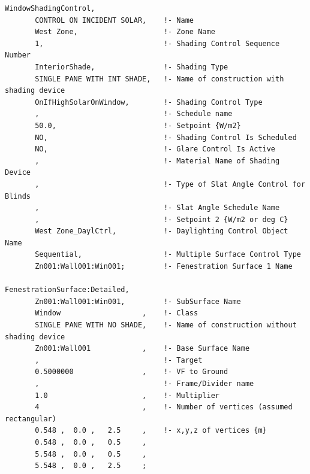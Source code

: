 \begin{lstlisting}
WindowShadingControl,
       CONTROL ON INCIDENT SOLAR,    !- Name
       West Zone,                    !- Zone Name
       1,                            !- Shading Control Sequence Number
       InteriorShade,                !- Shading Type
       SINGLE PANE WITH INT SHADE,   !- Name of construction with shading device
       OnIfHighSolarOnWindow,        !- Shading Control Type
       ,                             !- Schedule name
       50.0,                         !- Setpoint {W/m2}
       NO,                           !- Shading Control Is Scheduled
       NO,                           !- Glare Control Is Active
       ,                             !- Material Name of Shading Device
       ,                             !- Type of Slat Angle Control for Blinds
       ,                             !- Slat Angle Schedule Name
       ,                             !- Setpoint 2 {W/m2 or deg C}
       West Zone_DaylCtrl,           !- Daylighting Control Object Name
       Sequential,                   !- Multiple Surface Control Type
       Zn001:Wall001:Win001;         !- Fenestration Surface 1 Name

FenestrationSurface:Detailed,
       Zn001:Wall001:Win001,         !- SubSurface Name
       Window                   ,    !- Class
       SINGLE PANE WITH NO SHADE,    !- Name of construction without shading device
       Zn001:Wall001            ,    !- Base Surface Name
       ,                             !- Target
       0.5000000                ,    !- VF to Ground
       ,                             !- Frame/Divider name
       1.0                      ,    !- Multiplier
       4                        ,    !- Number of vertices (assumed rectangular)
       0.548 ,  0.0 ,   2.5     ,    !- x,y,z of vertices {m}
       0.548 ,  0.0 ,   0.5     ,
       5.548 ,  0.0 ,   0.5     ,
       5.548 ,  0.0 ,   2.5     ;
\end{lstlisting}

